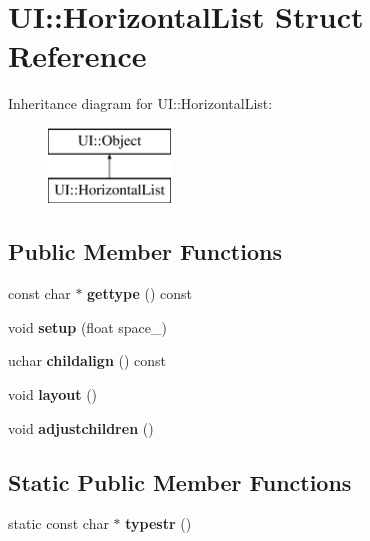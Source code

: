\hypertarget{struct_u_i_1_1_horizontal_list}{}\section{UI\+:\+:Horizontal\+List Struct Reference}
\label{struct_u_i_1_1_horizontal_list}
Inheritance diagram for UI\+:\+:Horizontal\+List\+:\begin{figure}[H]
\begin{center}
\leavevmode
\includegraphics[height=2.000000cm]{struct_u_i_1_1_horizontal_list}
\end{center}
\end{figure}
\subsection*{Public Member Functions}
\begin{DoxyCompactItemize}
\item 
\mbox{\label{struct_u_i_1_1_horizontal_list_a69a91132a6a618aa77552e9cd73c1291}} 
const char $\ast$ {\bfseries gettype} () const
\item 
\mbox{\label{struct_u_i_1_1_horizontal_list_affdd0a8d912b7a1148009d2b622ccb28}} 
void {\bfseries setup} (float space\+\_)
\item 
\mbox{\label{struct_u_i_1_1_horizontal_list_a7d9401d953278d6e6b4bf0c708be0c42}} 
uchar {\bfseries childalign} () const
\item 
\mbox{\label{struct_u_i_1_1_horizontal_list_aed6633bc0e9bff0267061f9ba8c21fb8}} 
void {\bfseries layout} ()
\item 
\mbox{\label{struct_u_i_1_1_horizontal_list_a4d4d6afe27986727407857dcf1420332}} 
void {\bfseries adjustchildren} ()
\end{DoxyCompactItemize}
\subsection*{Static Public Member Functions}
\begin{DoxyCompactItemize}
\item 
\mbox{\label{struct_u_i_1_1_horizontal_list_af18d7e314bb8eb16e2a1bd93953cc4fa}} 
static const char $\ast$ {\bfseries typestr} ()
\end{DoxyCompactItemize}
